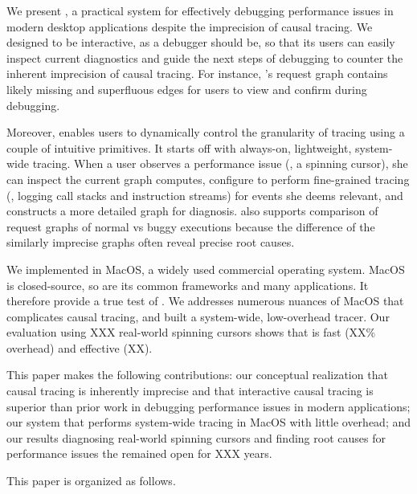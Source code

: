 We present \xxx, a practical system for effectively debugging performance
issues in modern desktop applications despite the imprecision of causal
tracing.  We designed \xxx to be interactive, as a debugger should be, so
that its users can easily inspect current diagnostics and guide the next
steps of debugging to counter the inherent imprecision of causal tracing.
For instance, \xxx's request graph contains likely missing and superfluous
edges for users to view and confirm during debugging.

Moreover, \xxx enables users to dynamically control the granularity of
tracing using a couple of intuitive primitives.  It starts off with
always-on, lightweight, system-wide tracing.  When a user observes a
performance issue (\eg, a spinning cursor), she can inspect the current
graph \xxx computes, configure \xxx to perform fine-grained tracing (\eg,
logging call stacks and instruction streams) for events she deems
relevant, and constructs a more detailed graph for diagnosis.  \xxx also
supports comparison of request graphs of normal vs buggy executions
because the difference of the similarly imprecise graphs often reveal
precise root causes.

We implemented \xxx in MacOS, a widely used commercial operating system.
MacOS is closed-source, so are its common frameworks and many
applications. It therefore provide a true test of \xxx.  We addresses
numerous nuances of MacOS that complicates causal tracing, and built a
system-wide, low-overhead tracer.  Our evaluation using XXX real-world
spinning cursors shows that \xxx is fast (XX\% overhead) and effective
(XX).

This paper makes the following contributions: our conceptual realization
that causal tracing is inherently imprecise and that interactive causal
tracing is superior than prior work in debugging performance issues in
modern applications; our system \xxx that performs system-wide tracing in
MacOS with little overhead; and our results diagnosing real-world spinning
cursors and finding root causes for performance issues the remained open
for XXX years.

This paper is organized as follows.



